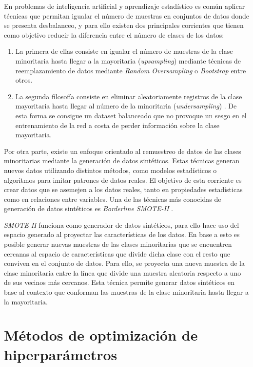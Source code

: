 En problemas de inteligencia artificial y aprendizaje estadístico es común aplicar técnicas que permitan igualar el número de muestras en conjuntos de datos donde se presenta desbalanceo, y para ello existen dos principales corrientes que tienen como objetivo reducir la diferencia entre el número de clases de los datos:

\begin{enumerate}
	\item La primera de ellas consiste en igualar el número de muestras de la clase minoritaria hasta llegar a la mayoritaria (\textit{upsampling}) mediante técnicas de reemplazamiento de datos mediante \textit{Random Oversampling} \cite{abdi2015combat} o \textit{Bootstrap} \cite{zoubir2007bootstrap} entre otros.
	\item La segunda filosofía consiste en eliminar aleatoriamente registros de la clase mayoritaria hasta llegar al número de la minoritaria (\textit{undersampling}) \cite{mohammed2020machine}. De esta forma se consigue un dataset balanceado que no provoque un sesgo en el entrenamiento de la red a costa de perder información sobre la clase mayoritaria.
\end{enumerate}

Por otra parte, existe un enfoque orientado al remuestreo de datos de las clases minoritarias mediante la generación de datos sintéticos. Estas técnicas generan nuevos datos utilizando distintos métodos, como modelos estadísticos o algoritmos para imitar patrones de datos reales. El objetivo de esta corriente es crear datos que se asemejen a los datos reales, tanto en propiedades estadísticas como en relaciones entre variables. Una de las técnicas más conocidas de generación de datos sintéticos es \textit{Borderline SMOTE-II} \cite{han2005borderline}.

\textit{SMOTE-II} funciona como generador de datos sintéticos, para ello hace uso del espacio generado al proyectar las características de los datos. En base a esto es posible generar nuevas muestras de las clases minoritarias que se encuentren cercanas al espacio de características que divide dicha clase con el resto que conviven en el conjunto de datos. Para ello, se proyecta una nueva muestra de la clase minoritaria entre la línea que divide una muestra aleatoria respecto a uno de sus vecinos más cercanos. Esta técnica permite generar datos sintéticos en base al contexto que conforman las muestras de la clase minoritaria hasta llegar a la mayoritaria.

\section{Métodos de optimización de hiperparámetros}
\label{HYPERPARAMETERS_OPTIMIZATION_METHODS}

